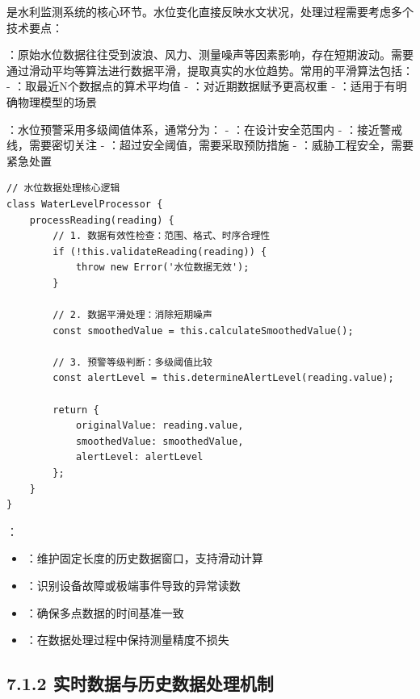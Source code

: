 是水利监测系统的核心环节。水位变化直接反映水文状况，处理过程需要考虑多个技术要点：

：原始水位数据往往受到波浪、风力、测量噪声等因素影响，存在短期波动。需要通过滑动平均等算法进行数据平滑，提取真实的水位趋势。常用的平滑算法包括： - ：取最近N个数据点的算术平均值 - ：对近期数据赋予更高权重 - ：适用于有明确物理模型的场景

：水位预警采用多级阈值体系，通常分为： - ：在设计安全范围内 - ：接近警戒线，需要密切关注 - ：超过安全阈值，需要采取预防措施 - ：威胁工程安全，需要紧急处置

\begin{lstlisting}[style=javascript]
// 水位数据处理核心逻辑
class WaterLevelProcessor {
    processReading(reading) {
        // 1. 数据有效性检查：范围、格式、时序合理性
        if (!this.validateReading(reading)) {
            throw new Error('水位数据无效');
        }
        
        // 2. 数据平滑处理：消除短期噪声
        const smoothedValue = this.calculateSmoothedValue();
        
        // 3. 预警等级判断：多级阈值比较
        const alertLevel = this.determineAlertLevel(reading.value);
        
        return {
            originalValue: reading.value,
            smoothedValue: smoothedValue,
            alertLevel: alertLevel
        };
    }
}
\end{lstlisting}

：

\begin{itemize}
\tightlist
\item
  ：维护固定长度的历史数据窗口，支持滑动计算
\item
  ：识别设备故障或极端事件导致的异常读数
\item
  ：确保多点数据的时间基准一致
\item
  ：在数据处理过程中保持测量精度不损失
\end{itemize}

\hypertarget{ux5b9eux65f6ux6570ux636eux4e0eux5386ux53f2ux6570ux636eux5904ux7406ux673aux5236}{%
\subsection{7.1.2 实时数据与历史数据处理机制}\label{ux5b9eux65f6ux6570ux636eux4e0eux5386ux53f2ux6570ux636eux5904ux7406ux673aux5236}}

